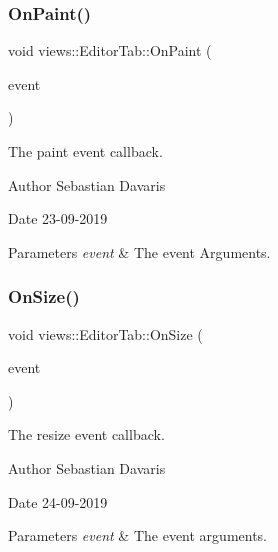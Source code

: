 \subsubsection{\texorpdfstring{On\+Paint()}{OnPaint()}}
{\footnotesize\ttfamily void views\+::\+Editor\+Tab\+::\+On\+Paint (\begin{DoxyParamCaption}\item[{wx\+Paint\+Event \&}]{event }\end{DoxyParamCaption})\hspace{0.3cm}{\ttfamily [protected]}}

The paint event callback. \begin{DoxyAuthor}{Author}
Sebastian Davaris 
\end{DoxyAuthor}
\begin{DoxyDate}{Date}
23-\/09-\/2019 
\end{DoxyDate}

\begin{DoxyParams}{Parameters}
{\em event} & The event Arguments. \\
\hline
\end{DoxyParams}
\mbox{\label{classviews_1_1_editor_tab_a5b404f2ea3e322481fe63a4b2c24154c}} 
\subsubsection{\texorpdfstring{On\+Size()}{OnSize()}}
{\footnotesize\ttfamily void views\+::\+Editor\+Tab\+::\+On\+Size (\begin{DoxyParamCaption}\item[{wx\+Size\+Event \&}]{event }\end{DoxyParamCaption})\hspace{0.3cm}{\ttfamily [protected]}}

The resize event callback. \begin{DoxyAuthor}{Author}
Sebastian Davaris 
\end{DoxyAuthor}
\begin{DoxyDate}{Date}
24-\/09-\/2019 
\end{DoxyDate}

\begin{DoxyParams}{Parameters}
{\em event} & The event arguments. \\
\hline
\end{DoxyParams}
\mbox{\label{classviews_1_1_editor_tab_a64a45fb74ae413acf6485294b55294d5}} 
